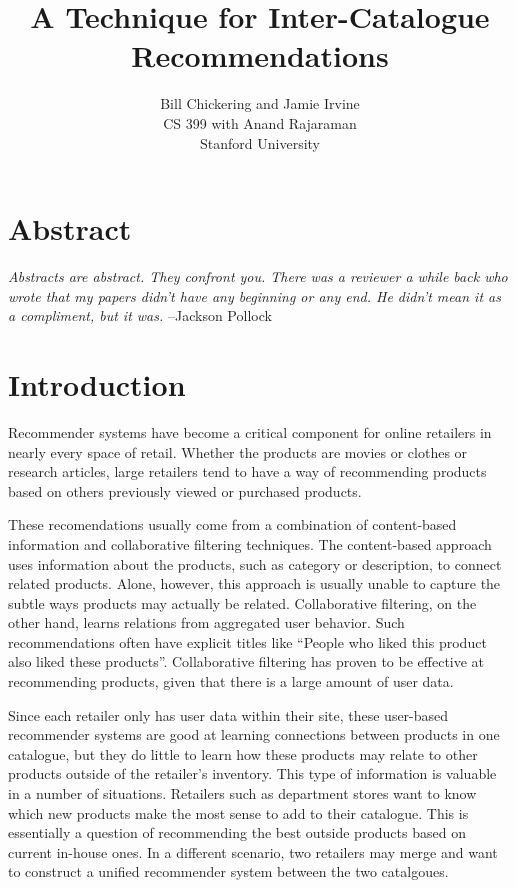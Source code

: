 \documentclass[11pt]{article}
\begin{document}

\title{A Technique for Inter-Catalogue Recommendations}
\author{Bill Chickering and Jamie Irvine\\
CS 399 with Anand Rajaraman\\
Stanford University}
\renewcommand{\today}{June 12, 2014}
\maketitle

\section*{Abstract}
\emph{Abstracts are abstract. They confront you. There was a reviewer a
while back who wrote that my papers didn't have any beginning or any end. He
didn't mean it as a compliment, but it was.} --Jackson Pollock

\section*{Introduction}
Recommender systems have become a critical component for online retailers in
nearly every space of retail. Whether the products are movies or clothes or
research articles, large retailers tend to have a way of recommending products
based on others previously viewed or purchased products.

These recomendations usually come from a combination of content-based
information and collaborative filtering techniques. The content-based approach
uses information about the products, such as category or description, to connect
related products. Alone, however, this approach is usually unable to capture the
subtle ways products may actually be related. Collaborative filtering, on the
other hand, learns relations from aggregated user behavior.  Such
recommendations often have explicit titles like ``People who liked this product
also liked these products''. Collaborative filtering has proven to be effective
at recommending products, given that there is a large amount of user data.

Since each retailer only has user data within their site, these user-based
recommender systems are good at learning connections between products in one
catalogue, but they do little to learn how these products may relate to other
products outside of the retailer's inventory. This type of information is
valuable in a number of situations. Retailers such as department stores want to
know which new products make the most sense to add to their catalogue.  This is
essentially a question of recommending the best outside products based on
current in-house ones. In a different scenario, two retailers may merge and want
to construct a unified recommender system between the two catalgoues.
\end{document}
